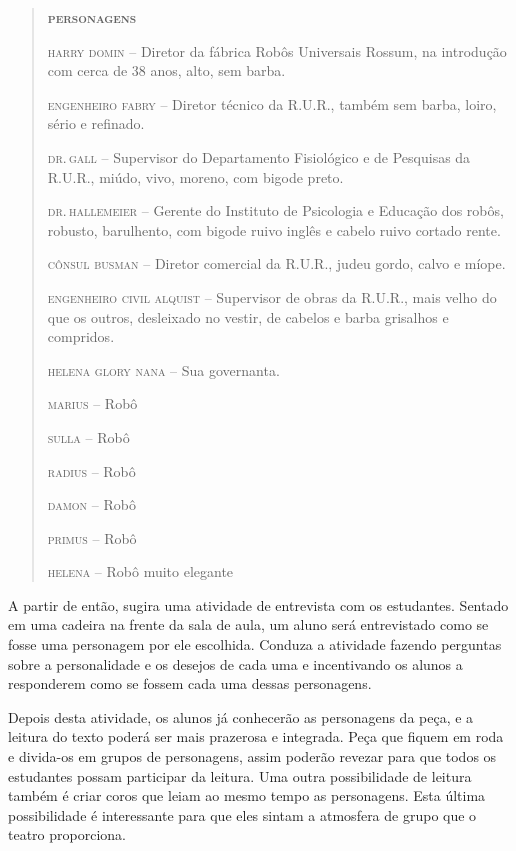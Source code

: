 \documentclass[11pt]{extarticle}
\begin{document}
\begin{quotation}
\textsc{\textbf{personagens}} 

\textsc{harry domin} 		--  Diretor da fábrica Robôs Universais Rossum, na introdução com cerca de 38 anos, alto, sem barba.

\textsc{engenheiro fabry} 	--  Diretor técnico da R.U.R., também sem barba, loiro, sério e refinado. 

\textsc{dr.\,gall} 		--  Supervisor do Departamento Fisiológico e de Pesquisas da R.U.R., miúdo, vivo, moreno, com bigode preto.

\textsc{dr.\,hallemeier} 	-- Gerente do Instituto de Psicologia e Educação dos robôs, robusto, barulhento, com bigode ruivo inglês e cabelo ruivo cortado rente. 

\textsc{cônsul busman} 		--  Diretor comercial da R.U.R., judeu gordo, calvo e míope. 

\textsc{engenheiro civil alquist} --  Supervisor de obras da R.U.R., mais velho do que os outros, desleixado no vestir, de cabelos e barba grisalhos e compridos. 

\textsc{helena} \textsc{glory} 
\textsc{nana} 				-- Sua governanta. 

\textsc{marius} 			-- Robô

\textsc{sulla} 				-- Robô

\textsc{radius} 			-- Robô

\textsc{damon} 				-- Robô

\textsc{primus} 			-- Robô

\textsc{helena} 			-- Robô muito elegante
\end{quotation}

A partir de então, sugira uma atividade de entrevista com os estudantes. Sentado em uma cadeira na frente da sala de aula, um aluno será entrevistado como se fosse uma personagem por ele escolhida. Conduza a atividade fazendo perguntas sobre a personalidade e os desejos de cada uma e incentivando os alunos a responderem como se fossem cada uma dessas personagens.


Depois desta atividade, os alunos já conhecerão as personagens da peça, e a leitura do texto poderá ser mais prazerosa e integrada. Peça que fiquem em roda e divida-os em grupos de personagens, assim poderão revezar para que todos os estudantes possam participar da leitura. Uma outra possibilidade de leitura também é criar coros que leiam ao mesmo tempo as personagens. Esta última possibilidade é interessante para que eles sintam a atmosfera de grupo que o teatro proporciona.
\end{document}
